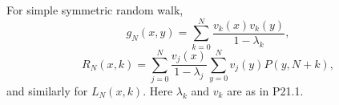For simple symmetric random walk,
\[
g_N(x,y) = \sum_{k=0}^{N} \frac{v_k(x) v_k(y)}{1 - \lambda_k},
\]
\[
R_N(x,k) = \sum_{j=0}^{N} \frac{v_j(x)}{1 - \lambda_j} \sum_{y=0}^{N} v_j(y) P(y, N+k),
\]
and similarly for \(L_N(x,k)\). Here \(\lambda_k\) and \(v_k\) are as in P21.1.

